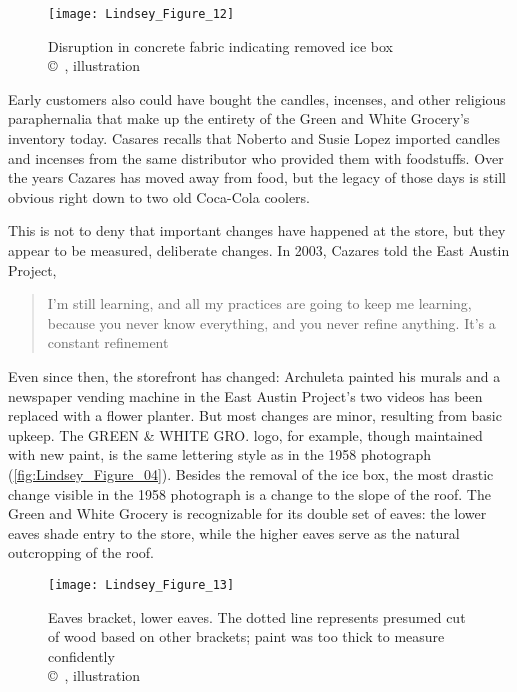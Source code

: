 \begin{figure}[!htb]
	\texttt{[image: Lindsey\_Figure\_12]}
	\caption{Disruption in concrete fabric indicating removed ice box\\
		{\normalfont\scriptsize \copyright\
			\shortauthor, illustration
	}}
	\label{fig:Lindsey_Figure_12}
\end{figure}

Early customers also could have bought the candles, incenses, and other religious paraphernalia that make up the entirety of the Green and White Grocery's inventory today. Casares recalls that Noberto and Susie Lopez imported candles and incenses from the same distributor who provided them with foodstuffs. Over the years Cazares has moved away from food, but the legacy of those days is still obvious right down to two old Coca-Cola coolers.

This is not to deny that important changes have happened at the store, but they appear to be measured, deliberate changes. In 2003, Cazares told the East Austin Project, \blockcquote{becker}{I'm still learning, and all my practices are going to keep me learning, because you never know everything, and you never refine anything. It's a constant refinement}. Even since then, the storefront has changed: Archuleta painted his murals and a newspaper vending machine in the East Austin Project’s two videos has been replaced with a flower planter. But most changes are minor, resulting from basic upkeep. The GREEN \& WHITE GRO. logo, for example, though maintained with new paint, is the same lettering style as in the 1958 photograph (\cref{fig:Lindsey_Figure_04}). Besides the removal of the ice box, the most drastic change visible in the 1958 photograph is a change to the slope of the roof. The Green and White Grocery is recognizable for its double set of eaves: the lower eaves shade entry to the store, while the higher eaves serve as the natural outcropping of the roof.

\begin{figure}[!htb]
	\texttt{[image: Lindsey\_Figure\_13]}
	\caption{Eaves bracket, lower eaves. The dotted line represents presumed cut of wood based on other brackets; paint was too thick to measure confidently\\
		{\normalfont\scriptsize \copyright\
			\shortauthor, illustration
	}}
	\label{fig:Lindsey_Figure_13}
\end{figure}

